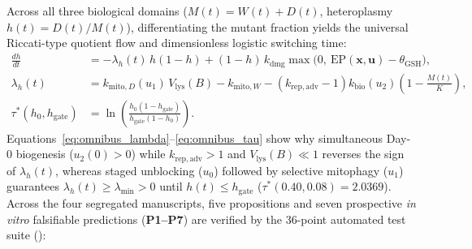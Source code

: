 \documentclass[11pt]{article}
\begin{document}
Across all three biological domains ($M(t) = W(t) + D(t)$, heteroplasmy $h(t) = D(t) / M(t)$), differentiating the mutant fraction yields the universal Riccati-type quotient flow and dimensionless logistic switching time:
\begin{align}
  \frac{dh}{dt} &= -\lambda_h(t)\,h(1-h) + (1-h)\,k_{\mathrm{dmg}}\max\!\big(0,\ \mathrm{EP}(\mathbf{x},\mathbf{u}) - \theta_{\mathrm{GSH}}\big), \label{eq:omnibus_riccati}\\
  \lambda_h(t) &= k_{\mathrm{mito},D}(u_1)\,V_{\mathrm{lys}}(B) - k_{\mathrm{mito},W} - \left(k_{\mathrm{rep,adv}} - 1\right)k_{\mathrm{bio}}(u_2)\left(1 - \frac{M(t)}{K}\right), \label{eq:omnibus_lambda}\\
  \tau^*(h_0, h_{\mathrm{gate}}) &= \ln\!\left(\frac{h_0(1-h_{\mathrm{gate}})}{h_{\mathrm{gate}}(1-h_0)}\right). \label{eq:omnibus_tau}
\end{align}
Equations~\eqref{eq:omnibus_lambda}--\eqref{eq:omnibus_tau} show why simultaneous Day-0 biogenesis ($u_2(0) > 0$) while $k_{\mathrm{rep,adv}} > 1$ and $V_{\mathrm{lys}}(B) \ll 1$ reverses the sign of $\lambda_h(t)$, whereas staged unblocking ($u_0$) followed by selective mitophagy ($u_1$) guarantees $\lambda_h(t) \ge \lambda_{\min} > 0$ until $h(t) \le h_{\mathrm{gate}}$ ($\tau^*(0.40, 0.08) = 2.0369$). Across the four segregated manuscripts, five propositions and seven prospective \textit{in vitro} falsifiable predictions (\textbf{P1--P7}) are verified by the 36-point automated test suite ():
\end{document}
